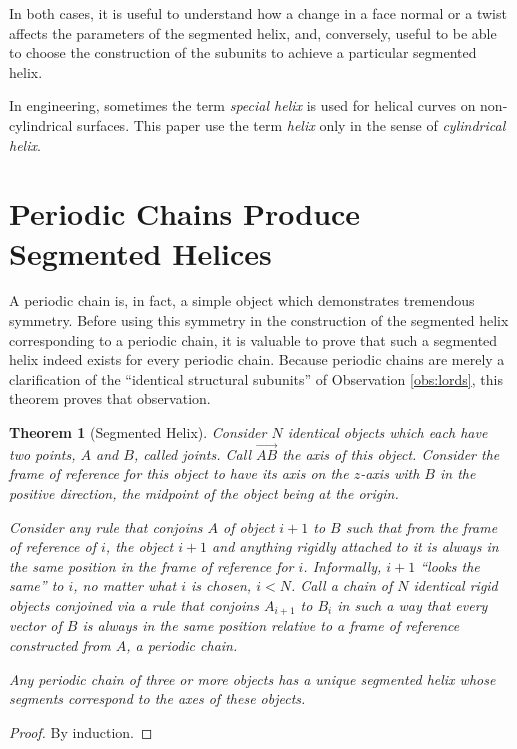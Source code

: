 \documentclass[11pt]{article}
\newtheorem{theorem}{Theorem}
\begin{document}
{In both cases, it is useful to understand how a change in a face normal
or a twist affects the parameters
of the segmented helix,
and, conversely, useful to be able to choose the construction
of the subunits to achieve a particular segmented helix.

In engineering, sometimes the term {\em special helix}\cite{gu2012research}
is used for helical curves on non-cylindrical surfaces.
This paper use the term {\em helix} only in the
sense of {\em cylindrical helix}.

\section{Periodic Chains Produce Segmented Helices}

A periodic chain is, in fact, a simple object which demonstrates tremendous symmetry.
Before using this symmetry in the construction of the segmented helix corresponding to a periodic chain,
it is valuable to
prove that such a segmented helix indeed exists for every periodic chain.
Because periodic chains are merely a clarification of the ``identical structural subunits''
of Observation \ref{obs:lords},
this theorem proves that observation.

\begin{theorem}[Segmented Helix]
  \label{thm:helix}
  Consider $N$ identical objects which each have two points, $A$ and $B$, called {\em joints}. Call
  $\overrightarrow{AB}$ the {\em axis} of this object.
  Consider the frame of reference for this object to have
  its axis on the $z$-axis with $B$ in the positive direction, the
  midpoint of the object being at the origin.

  Consider any rule that conjoins $A$ of object $i+1$ to $B$ such that
  from the frame of reference of $i$, the object $i+1$ and anything rigidly
  attached to it is always in the same position in the frame of reference for $i$.
  Informally, $i+1$ ``looks the same'' to $i$, no matter what $i$ is chosen, $i < N$.
  Call a chain of $N$ identical rigid objects conjoined via a rule that
  conjoins $A_{i+1}$ to $B_i$ in such a way that every vector
  of $B$ is always in the same position relative to a frame of reference
  constructed from $A$, a {\em periodic chain.}

  Any periodic chain of three or more objects has a unique segmented helix
  whose segments correspond
  to the axes of these objects.
\end{theorem}

\begin{proof}
  By induction.


\end{proof}}
\end{document}
